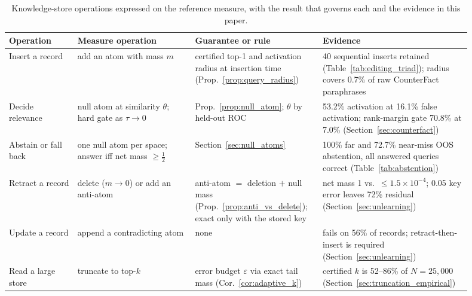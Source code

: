 \documentclass[preprint,12pt]{elsarticle}
\newif\ifmarkchanges
\newcommand{\revii}[1]{\ifmarkchanges{\color{blue}#1}\else#1\fi}
\begin{document}
\begin{table}[t]
\centering
\caption{\revii{Knowledge-store operations expressed on the reference measure, with the result that governs each and the evidence in this paper.}}
\label{tab:kb_ops}
\vspace{0.5em}
\footnotesize
\begin{tabular}{@{}L{0.14\linewidth}L{0.24\linewidth}L{0.24\linewidth}L{0.28\linewidth}@{}}
\toprule
\revii{Operation} & \revii{Measure operation} & \revii{Guarantee or rule} & \revii{Evidence} \\
\midrule
\revii{Insert a record} & \revii{add an atom with mass $m$} & \revii{certified top-1 and activation radius at insertion time (Prop.~\ref{prop:query_radius})} & \revii{40 sequential inserts retained (Table~\ref{tab:editing_triad}); radius covers 0.7\% of raw CounterFact paraphrases} \\
\revii{Decide relevance} & \revii{null atom at similarity $\theta$; hard gate as $\tau\to0$} & \revii{Prop.~\ref{prop:null_atom}; $\theta$ by held-out ROC} & \revii{53.2\% activation at 16.1\% false activation; rank-margin gate 70.8\% at 7.0\% (Section~\ref{sec:counterfact})} \\
\revii{Abstain or fall back} & \revii{one null atom per space; answer iff net mass $\ge\tfrac12$} & \revii{Section~\ref{sec:null_atoms}} & \revii{100\% far and 72.7\% near-miss OOS abstention, all answered queries correct (Table~\ref{tab:abstention})} \\
\revii{Retract a record} & \revii{delete ($m\to0$) or add an anti-atom} & \revii{anti-atom $=$ deletion $+$ null mass (Prop.~\ref{prop:anti_vs_delete}); exact only with the stored key} & \revii{net mass 1 vs.\ $\le1.5\times10^{-4}$; 0.05 key error leaves 72\% residual (Section~\ref{sec:unlearning})} \\
\revii{Update a record} & \revii{append a contradicting atom} & \revii{none} & \revii{fails on 56\% of records; retract-then-insert is required (Section~\ref{sec:unlearning})} \\
\revii{Read a large store} & \revii{truncate to top-$k$} & \revii{error budget $\varepsilon$ via exact tail mass (Cor.~\ref{cor:adaptive_k})} & \revii{certified $k$ is 52--86\% of $N=25{,}000$ (Section~\ref{sec:truncation_empirical})} \\
\bottomrule
\end{tabular}
\end{table}
\end{document}
